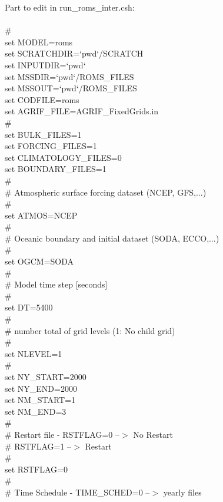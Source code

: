Part to edit in run\_roms\_inter.csh:\\
\\
\#\\
set MODEL=roms\\
set SCRATCHDIR=`pwd`/SCRATCH\\
set INPUTDIR=`pwd`\\
set MSSDIR=`pwd`/ROMS\_FILES\\
set MSSOUT=`pwd`/ROMS\_FILES\\
set CODFILE=roms\\
set AGRIF\_FILE=AGRIF\_FixedGrids.in\\
\#\\
set BULK\_FILES=1\\
set FORCING\_FILES=1\\
set CLIMATOLOGY\_FILES=0\\
set BOUNDARY\_FILES=1\\
\#\\
\# Atmospheric surface forcing dataset (NCEP, GFS,...)\\
\#\\
set ATMOS=NCEP\\
\#\\
\# Oceanic boundary and initial dataset (SODA, ECCO,...)\\
\#\\
set OGCM=SODA\\
\#\\
\# Model time step [seconds]\\
\#\\
set DT=5400\\
\#\\
\# number total of grid levels (1: No child grid)\\
\#\\
set NLEVEL=1\\
\#\\
set NY\_START=2000\\
set NY\_END=2000\\
set NM\_START=1\\
set NM\_END=3\\
\#\\
\#  Restart file - RSTFLAG=0 --$>$ No Restart\\
\#		  RSTFLAG=1 --$>$ Restart\\
\#\\
set RSTFLAG=0\\
\#\\
\#  Time Schedule  -  TIME\_SCHED=0 --$>$ yearly files\\
